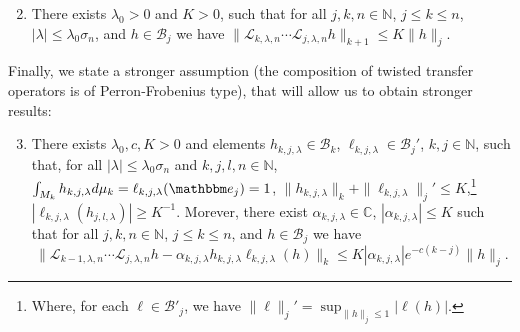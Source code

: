 \documentclass{amsart}
\numberwithin{equation}{section}
\newcommand\cB{{\mathcal B}}
\newcommand\cL{{\mathcal L}}
\newcommand\bC{{\mathbb C}}
\newcommand\bN{{\mathbb N}}
\newcommand{\bbe}{\mathbbm e}
\begin{document}
\smallskip
\begin{enumerate}[\bf(O-1)]\setcounter{enumi}{1}
\item \label{cond:lambda_multiplier} There exists $\lambda_0>0$ and $K>0$, such that for all 
$j,k,n\in\bN$, $j \le k \le n$, 
$|\lambda|\leq \lambda_0\sigma_n$, and $h\in \cB_{j}$ we have 
$\|\cL_{k,\lambda,n}\cdots \cL_{j,\lambda,n} h\|_{k+1}\leq K \|h\|_j$.
\end{enumerate}

\smallskip
Finally, we state a stronger assumption (the composition of twisted transfer operators is of Perron-Frobenius type), that will allow us to obtain stronger results:

\smallskip
\begin{enumerate}[\bf(O-1)]\setcounter{enumi}{2}
\item \label{cond:lambda_multiplier2} There exists $\lambda_0, c, K>0$ and elements $h_{k,j,\lambda}\in\cB_k$, $\ell_{k,j,\lambda}\in\cB_j'$, $k,j\in\bN$, such that, for all $|\lambda|\leq \lambda_0\sigma_n$ and $k,j,l,n\in\bN$, $\int_{M_k} h_{k,j,\lambda}d\mu_k=\ell_{k,j,\lambda}(\bbe_j)=1$, $\|h_{k,j,\lambda}\|_{k}+ \|\ell_{k,j,\lambda}\|_{j}' \leq K$,\footnote{ Where, for each $\ell\in \cB'_j$, we have $\|\ell\|_{j}' =\sup_{\|h\|_j\leq 1}|\ell(h)|$.}  $|\ell_{k,j,\lambda}(h_{j,l,\lambda})|\geq K^{-1}$. Morever, there exist $\alpha_{k,j,\lambda}\in\bC$, $|\alpha_{k,j,\lambda}|\leq K$ such that for all  $j,k,n\in\bN$, $j \le k \le n$,  and $h\in \cB_{j}$ we have 
\begin{equation}
\label{eq:O3 decay}
\| \cL_{k-1,\lambda, n}\cdots \cL_{j,\lambda, n} h -\alpha_{k,j,\lambda}h_{k,j,\lambda}\ell_{k,j,\lambda}(h)\|_{k}\leq K |\alpha_{k,j,\lambda}|e^{-c(k-j)}\|h\|_j.
\end{equation}
\end{enumerate}
\end{document}
